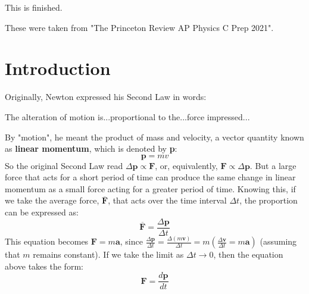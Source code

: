 \documentclass{article}
\begin{document}
\begin{finished}
    This is finished.
\end{finished}

\begin{note}
    These were taken from "The Princeton Review AP Physics C Prep 2021". 
\end{note}

\section{Introduction}
Originally, Newton expressed his Second Law in words:
\begin{displayquote}
    The alteration of motion is...proportional to the...force impressed...
\end{displayquote}
By "motion", he meant the product of mass and velocity, a vector quantity known as \textbf{linear momentum}, which is denoted by \textbf{p}:
\begin{equation*}
    \textbf{p}=mv
\end{equation*}
So the original Second Law read $\Delta \textbf{p} \propto \textbf{F}$, or, equivalently, $\textbf{F} \propto \Delta \textbf{p}$.
But a large force that acts for a short period of time can produce the same change in linear momentum as a small force acting for a greater period of time. 
Knowing this, if we take the average force, $\overline{\textbf{F}}$, that acts over the time interval $\Delta t$, the proportion can be expressed as:
\begin{equation*}
    \overline{\textbf{F}} = \frac{\Delta \textbf{p}}{\Delta t}
\end{equation*}
This equation becomes $\textbf{F} = m\textbf{a}$, since $\frac{\Delta \textbf{p}}{\Delta t}=\frac{\Delta(m\textbf{v})}{\Delta t} = m(\frac{\Delta \textbf{v}}{\Delta t} = m\textbf{a})$ (assuming that $m$ remains constant). If we take the limit as $\Delta t \rightarrow 0$, then the equation above takes the form:
\begin{equation*}
    \textbf{F} = \frac{d\textbf{p}}{dt}
\end{equation*}
\end{document}
